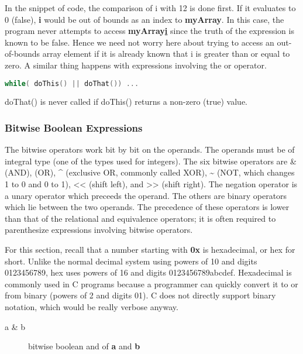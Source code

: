 In the snippet of code, the comparison of i with 12 is done first. If it
evaluates to 0 (false), \textbf{i} would be out of bounds as an index to
\textbf{myArray}. In this case, the program never attempts to access
\textbf{myArray\url{i}} since the truth of the expression is known to be false.
Hence we need not worry here about trying to access an out-of-bounds array
element if it is already known that i is greater than or equal to zero.
A similar thing happens with expressions involving the or \textbar{}\textbar{}
operator.
\lstset{basicstyle=\scriptsize, numbers=left, captionpos=b, tabsize=4}
\begin{lstlisting}[caption=Section \thesection listing \arabic{controlcnt},language={C},
breaklines=true,xleftmargin=15pt, label=lst:section\thesection listing\arabic{controlcnt}]
while( doThis() || doThat()) ...
\end{lstlisting}

doThat() is never called if doThis() returns a non-zero (true) value.

\subsubsection{Bitwise Boolean Expressions}
The bitwise operators work bit by bit on the operands. The operands must be of
integral type (one of the types used for integers). The six bitwise operators
are \& (AND), \textbar{} (OR), \^{} (exclusive OR, commonly called XOR), \~{}
(NOT, which changes 1 to 0 and 0 to 1), \textless{}\textless{} (shift left),
and \textgreater{}\textgreater{} (shift right). The negation operator is a
unary operator which preceeds the operand. The others are binary operators
which lie between the two operands. The precedence of these operators is lower
than that of the relational and equivalence operators; it is often required to
parenthesize expressions involving bitwise operators.

For this section, recall that a number starting with \textbf{0x} is
hexadecimal, or hex for short. Unlike the normal decimal system using powers of
10 and digits 0123456789, hex uses powers of 16 and digits 0123456789abcdef.
Hexadecimal is commonly used in C programs because a programmer can quickly
convert it to or from binary (powers of 2 and digits 01). C does not directly
support binary notation, which would be really verbose anyway.

\begin{description}
	\item[a \& b] bitwise boolean and of \textbf{a} and \textbf{b}
\end{description}

